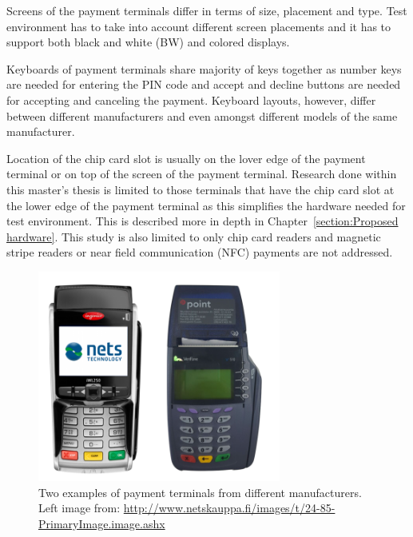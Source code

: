 Screens of the payment terminals differ in terms of size, placement and type. Test environment has to take into account different screen placements and it has to support both black and white (BW) and colored displays.

Keyboards of payment terminals share majority of keys together as number keys are needed for entering the PIN code and accept and decline buttons are needed for accepting and canceling the payment. Keyboard layouts, however, differ between different manufacturers and even amongst different models of the same manufacturer.

Location of the chip card slot is usually on the lover edge of the payment terminal or on top of the screen of the payment terminal. Research done within this master's thesis is limited to those terminals that have the chip card slot at the lower edge of the payment terminal as this simplifies the hardware needed for test environment. This is described more in depth in Chapter~\ref{section:Proposed hardware}. This study is also limited to only chip card readers and magnetic stripe readers or near field communication (NFC) payments are not addressed.

\begin{figure}[ht]
  \begin{center}
    \includegraphics[width=8cm]{images/terminal1.png}
    \caption{Two examples of payment terminals from different manufacturers. Left image from: \url{http://www.netskauppa.fi/images/t/24-85-PrimaryImage.image.ashx}}
    \label{fig:terminals}
  \end{center}
\end{figure}

